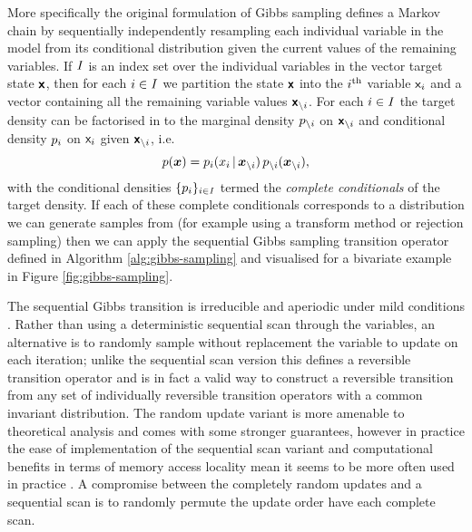 More specifically the original formulation of Gibbs sampling defines a Markov chain by sequentially independently resampling each individual variable in the model from its conditional distribution given the current values of the remaining variables. If $\mathit{I}$ is an index set over the individual variables in the vector target state $\boldsymbol{\mathsf{x}}$, then for each $i \in \mathit{I}$ we partition the state $\boldsymbol{\mathsf{x}}$ into the $i^{\rm th}$ variable $\mathsf{x}_i$ and a vector containing all the remaining variable values $\boldsymbol{\mathsf{x}}_{\backslash i}$. For each $i \in \mathit{I}$ the target density can be factorised in to the marginal density $p_{\backslash i}$ on $\boldsymbol{\mathsf{x}}_{\backslash i}$ and conditional density $p_i$ on $\mathsf{x}_i$ given $\boldsymbol{\mathsf{x}}_{\backslash i}$, i.e.
\begin{equation}\label{eq:gibbs-sampling-complete-conditional-factorisation}
  p(\boldsymbol{x}) = p_{i}(x_i \operatorname{|} \boldsymbol{x}_{\backslash i}) \, p_{\backslash i}(\boldsymbol{x}_{\backslash i}),
\end{equation}
with the conditional densities $\lbrace p_i \rbrace_{i \in \mathit{I}}$ termed the \emph{complete conditionals} of the target density. If each of these complete conditionals corresponds to a distribution we can generate samples from (for example using a transform method or rejection sampling) then we can apply the sequential Gibbs sampling transition operator defined in Algorithm \ref{alg:gibbs-sampling} and visualised for a bivariate example in Figure \ref{fig:gibbs-sampling}.

The sequential Gibbs transition is irreducible and aperiodic under mild conditions \citep{roberts1994simple,chan1993asymptotic}. Rather than using a deterministic sequential scan through the variables, an alternative is to randomly sample without replacement the variable to update on each iteration; unlike the sequential scan version this defines a reversible transition operator and is in fact a valid way to construct a reversible transition from any set of individually reversible transition operators with a common invariant distribution. The random update variant is more amenable to theoretical analysis and comes with some stronger guarantees, however in practice the ease of implementation of the sequential scan variant and computational benefits in terms of memory access locality mean it seems to be more often used in practice \citep{he2016scan}. A compromise between the completely random updates and a sequential scan is to randomly permute the update order have each complete scan.

